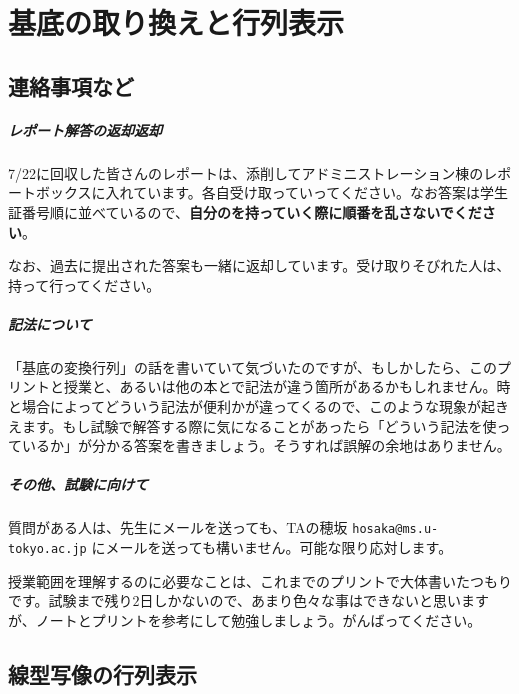 \chapter{基底の取り換えと行列表示}

\section{連絡事項など}

\paragraph{レポート解答の返却返却}

7/22に回収した皆さんのレポートは、添削してアドミニストレーション棟のレポートボックスに入れています。各自受け取っていってください。なお答案は学生証番号順に並べているので、\textbf{自分のを持っていく際に順番を乱さないでください}。

なお、過去に提出された答案も一緒に返却しています。受け取りそびれた人は、持って行ってください。

\paragraph{記法について} 「基底の変換行列」の話を書いていて気づいたのですが、もしかしたら、このプリントと授業と、あるいは他の本とで記法が違う箇所があるかもしれません。時と場合によってどういう記法が便利かが違ってくるので、このような現象が起きえます。もし試験で解答する際に気になることがあったら「どういう記法を使っているか」が分かる答案を書きましょう。そうすれば誤解の余地はありません。

\paragraph{その他、試験に向けて}

質問がある人は、先生にメールを送っても、TAの穂坂 \texttt{hosaka@ms.u-tokyo.ac.jp} にメールを送っても構いません。可能な限り応対します。

授業範囲を理解するのに必要なことは、これまでのプリントで大体書いたつもりです。試験まで残り$2$日しかないので、あまり色々な事はできないと思いますが、ノートとプリントを参考にして勉強しましょう。がんばってください。

\section{線型写像の行列表示}

